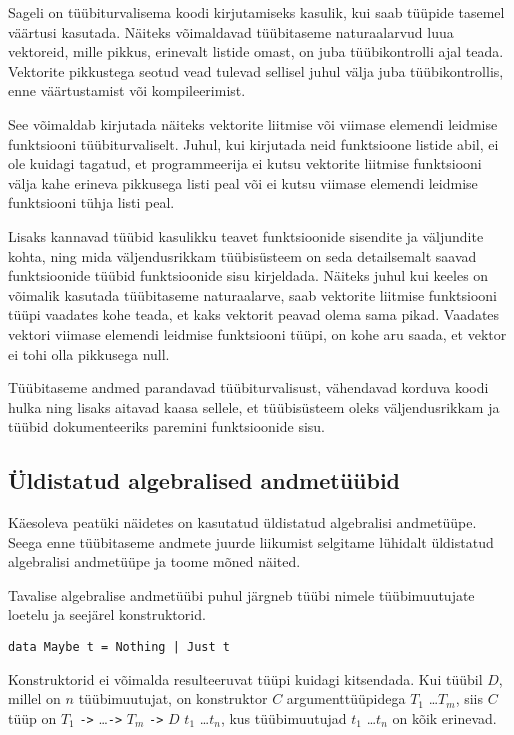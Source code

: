 \documentclass[12pt]{article}
\begin{document}
    Sageli on tüübiturvalisema koodi kirjutamiseks kasulik, kui saab tüüpide tasemel väärtusi kasutada. Näiteks võimaldavad tüübitaseme naturaalarvud luua vektoreid, mille pikkus, erinevalt listide omast, on juba tüübikontrolli ajal teada. Vektorite pikkustega seotud vead tulevad sellisel juhul välja juba tüübikontrollis, enne väärtustamist või kompileerimist.

    See võimaldab kirjutada näiteks vektorite liitmise või viimase elemendi leidmise funktsiooni tüübiturvaliselt. Juhul, kui kirjutada neid funktsioone listide abil, ei ole kuidagi tagatud, et programmeerija ei kutsu vektorite liitmise funktsiooni välja kahe erineva pikkusega listi peal või ei kutsu viimase elemendi leidmise funktsiooni tühja listi peal.

    Lisaks kannavad tüübid kasulikku teavet funktsioonide sisendite ja väljundite kohta, ning mida väljendusrikkam tüübisüsteem on seda detailsemalt saavad funktsioonide tüübid funktsioonide sisu kirjeldada. Näiteks juhul kui keeles on võimalik kasutada tüübitaseme naturaalarve, saab vektorite liitmise funktsiooni tüüpi vaadates kohe teada, et kaks vektorit peavad olema sama pikad. Vaadates vektori viimase elemendi leidmise funktsiooni tüüpi, on kohe aru saada, et vektor ei tohi olla pikkusega null.

    Tüübitaseme andmed parandavad tüübiturvalisust, vähendavad korduva koodi hulka ning lisaks aitavad kaasa sellele, et tüübisüsteem oleks väljendusrikkam ja tüübid dokumenteeriks paremini funktsioonide sisu.
    \subsection{Üldistatud algebralised andmetüübid}
      Käesoleva peatüki näidetes on kasutatud üldistatud algebralisi andmetüüpe. Seega enne tüübitaseme andmete juurde liikumist selgitame lühidalt üldistatud algebralisi andmetüüpe ja toome mõned näited.

      Tavalise algebralise andmetüübi puhul järgneb tüübi nimele tüübimuutujate loetelu ja seejärel konstruktorid.

      \begin{verbatim}data Maybe t = Nothing | Just t\end{verbatim}

      Konstruktorid ei võimalda resulteeruvat tüüpi kuidagi kitsendada. Kui tüübil $D$, millel on $n$ tüübimuutujat, on konstruktor $C$ argumenttüüpidega $T_1$ \ldots $T_m$, siis $C$ tüüp on $T_1$ \verb!->! \ldots \verb!->! $T_m$ \verb!->! $D$ $t_1$ \ldots $t_n$, kus tüübimuutujad $t_1$ \ldots $t_n$ on kõik erinevad.
\end{document}
